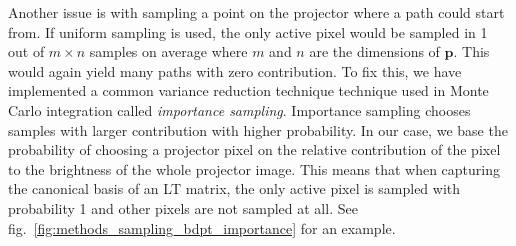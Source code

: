 Another issue is with sampling a point on the projector where a path could start from. If uniform sampling is used, the only active pixel would be sampled in 1 out of \(m \times n\) samples on average where \(m\) and \(n\) are the dimensions of \(\bm{p}\). This would again yield many paths with zero contribution. To fix this, we have implemented a common variance reduction technique technique used in Monte Carlo integration called \textit{importance sampling}. Importance sampling chooses samples with larger contribution with higher probability. In our case, we base the probability of choosing a projector pixel on the relative contribution of the pixel to the brightness of the whole projector image. This means that when capturing the canonical basis of an LT matrix, the only active pixel is sampled with probability 1 and other pixels are not sampled at all. See fig.~\ref{fig:methods_sampling_bdpt_importance} for an example.

